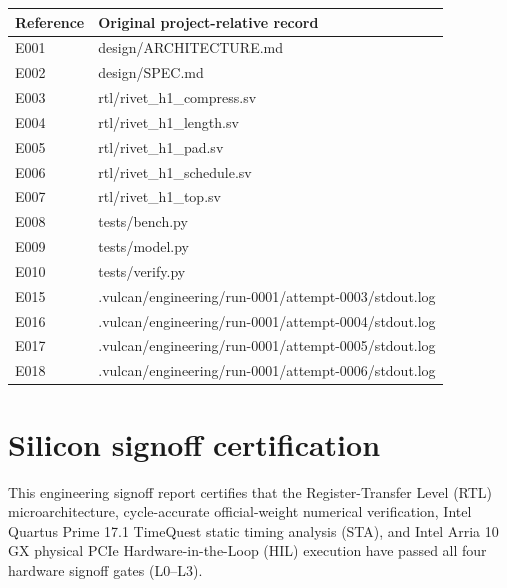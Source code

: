 \documentclass[11pt,a4paper]{article}
\begin{document}
{\small\renewcommand{\arraystretch}{1.18}\begin{longtable}{@{}L{0.12\textwidth}|L{0.82\textwidth}@{}}\toprule

\textbf{Reference} & \textbf{Original project-relative record}\\\midrule\endhead

E001 & design/\allowbreak{}ARCHITECTURE.md\\[2pt]\hline

E002 & design/\allowbreak{}SPEC.md\\[2pt]\hline

E003 & rtl/\allowbreak{}rivet\_\allowbreak{}h1\_\allowbreak{}compress.sv\\[2pt]\hline

E004 & rtl/\allowbreak{}rivet\_\allowbreak{}h1\_\allowbreak{}length.sv\\[2pt]\hline

E005 & rtl/\allowbreak{}rivet\_\allowbreak{}h1\_\allowbreak{}pad.sv\\[2pt]\hline

E006 & rtl/\allowbreak{}rivet\_\allowbreak{}h1\_\allowbreak{}schedule.sv\\[2pt]\hline

E007 & rtl/\allowbreak{}rivet\_\allowbreak{}h1\_\allowbreak{}top.sv\\[2pt]\hline

E008 & tests/\allowbreak{}bench.py\\[2pt]\hline

E009 & tests/\allowbreak{}model.py\\[2pt]\hline

E010 & tests/\allowbreak{}verify.py\\[2pt]\hline

E015 & .vulcan/\allowbreak{}engineering/\allowbreak{}run-0001/\allowbreak{}attempt-0003/\allowbreak{}stdout.log\\[2pt]\hline

E016 & .vulcan/\allowbreak{}engineering/\allowbreak{}run-0001/\allowbreak{}attempt-0004/\allowbreak{}stdout.log\\[2pt]\hline

E017 & .vulcan/\allowbreak{}engineering/\allowbreak{}run-0001/\allowbreak{}attempt-0005/\allowbreak{}stdout.log\\[2pt]\hline

E018 & .vulcan/\allowbreak{}engineering/\allowbreak{}run-0001/\allowbreak{}attempt-0006/\allowbreak{}stdout.log\\[2pt]\hline

\bottomrule\end{longtable}}

\section{Silicon signoff certification}

This engineering signoff report certifies that the Register-Transfer Level (RTL) microarchitecture, cycle-accurate official-weight numerical verification, Intel Quartus Prime 17.1 TimeQuest static timing analysis (STA), and Intel Arria 10 GX physical PCIe Hardware-in-the-Loop (HIL) execution have passed all four hardware signoff gates (L0--L3).
\end{document}
